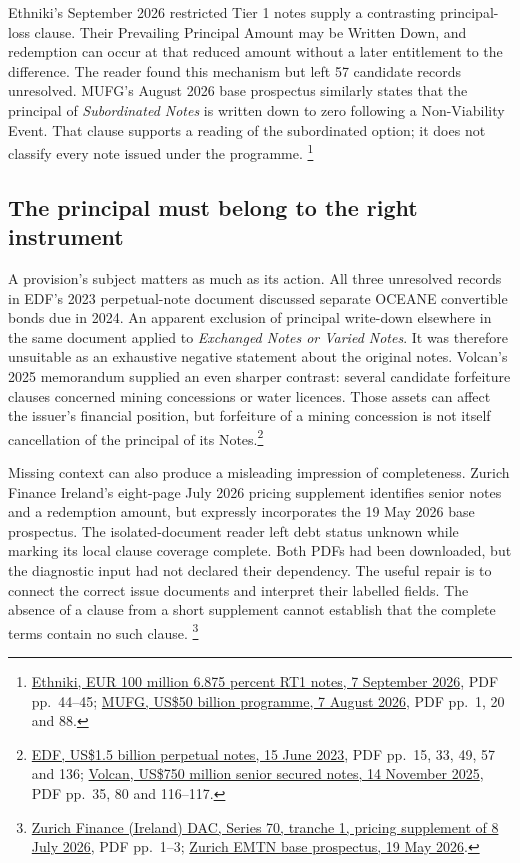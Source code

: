 Ethniki's September 2026 restricted Tier 1 notes supply a contrasting
principal-loss clause. Their Prevailing Principal Amount may be Written Down,
and redemption can occur at that reduced amount without a later entitlement
to the difference. The reader found this mechanism but left 57 candidate
records unresolved. MUFG's August 2026 base prospectus similarly states that
the principal of \emph{Subordinated Notes} is written down to zero following
a Non-Viability Event. That clause supports a reading of the subordinated
option; it does not classify every note issued under the programme.
\footnote{\href{../prospectus/difficulty-2026-10-04/pdfs/case-105585556.pdf}
{Ethniki, EUR 100 million 6.875 percent RT1 notes, 7 September 2026},
PDF pp.~44--45;
\href{../prospectus/difficulty-2026-10-04/pdfs/case-105541740.pdf}
{MUFG, US\$50 billion programme, 7 August 2026}, PDF pp.~1, 20 and 88.}

\subsection{The principal must belong to the right instrument}

A provision's subject matters as much as its action. All three unresolved
records in EDF's 2023 perpetual-note document discussed separate OCEANE
convertible bonds due in 2024. An apparent exclusion of principal write-down
elsewhere in the same document applied to \emph{Exchanged Notes or Varied
Notes}. It was therefore unsuitable as an exhaustive negative statement
about the original notes. Volcan's 2025 memorandum supplied an even sharper
contrast: several candidate forfeiture clauses concerned mining concessions
or water licences. Those assets can affect the issuer's financial position,
but forfeiture of a mining concession is not itself cancellation of the
principal of its Notes.\footnote{
\href{../prospectus/difficulty-2026-10-04/pdfs/case-103648885.pdf}
{EDF, US\$1.5 billion perpetual notes, 15 June 2023}, PDF pp.~15, 33, 49,
57 and 136;
\href{../prospectus/difficulty-2026-10-04/pdfs/case-105062309.pdf}
{Volcan, US\$750 million senior secured notes, 14 November 2025},
PDF pp.~35, 80 and 116--117.}

Missing context can also produce a misleading impression of completeness.
Zurich Finance Ireland's eight-page July 2026 pricing supplement identifies
senior notes and a redemption amount, but expressly incorporates the
19 May 2026 base prospectus. The isolated-document reader left debt status
unknown while marking its local clause coverage complete. Both PDFs had
been downloaded, but the diagnostic input had not declared their dependency.
The useful repair is to connect the correct issue documents and interpret
their labelled fields. The absence of a clause from a short supplement
cannot establish that the complete terms contain no such clause.
\footnote{\href{../prospectus/difficulty-2026-10-04/pdfs/case-105489584.pdf}
{Zurich Finance (Ireland) DAC, Series 70, tranche 1, pricing supplement
of 8 July 2026}, PDF pp.~1--3;
\href{../prospectus/difficulty-2026-10-04/pdfs/case-105392707.pdf}
{Zurich EMTN base prospectus, 19 May 2026}.}

